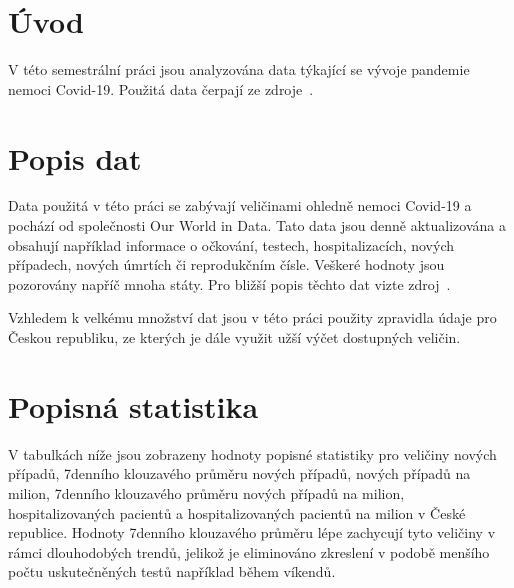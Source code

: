 \documentclass[a4paper, 12pt]{article}
\begin{document}



\titulniStrana
\generujObsah			%
\generujSeznamObrazku		%
\generujSeznamTabulek		%



\clearpage
\pagestyle{plain}		%
 {}
\section*{Úvod}
\label{uvod}

V této semestrální práci jsou analyzována data týkající se vývoje pandemie
nemoci Covid-19. Použitá data čerpají ze zdroje~\cite{1}.





\section{Popis dat}
Data použitá v této práci se zabývají veličinami ohledně nemoci Covid-19 a pochází
od společnosti Our World in Data. Tato data jsou denně aktualizována a obsahují
například informace o očkování, testech, hospitalizacích, nových případech,
nových úmrtích či reprodukčním čísle. Veškeré hodnoty jsou pozorovány napříč
mnoha státy. Pro bližší popis těchto dat vizte zdroj~\cite{1}.

Vzhledem k velkému množství dat jsou v této práci použity zpravidla údaje pro
Českou republiku, ze kterých je dále využit užší výčet dostupných veličin.

\section{Popisná statistika}

V tabulkách níže jsou zobrazeny hodnoty popisné statistiky pro veličiny nových případů,
7denního klouzavého průměru nových případů, nových případů na milion, 7denního klouzavého průměru nových případů na milion,
hospitalizovaných pacientů a hospitalizovaných pacientů na milion v České republice. Hodnoty 7denního klouzavého průměru
lépe zachycují tyto veličiny v rámci dlouhodobých trendů, jelikož je eliminováno zkreslení v podobě menšího počtu uskutečněných
testů například během víkendů.
\end{document}
